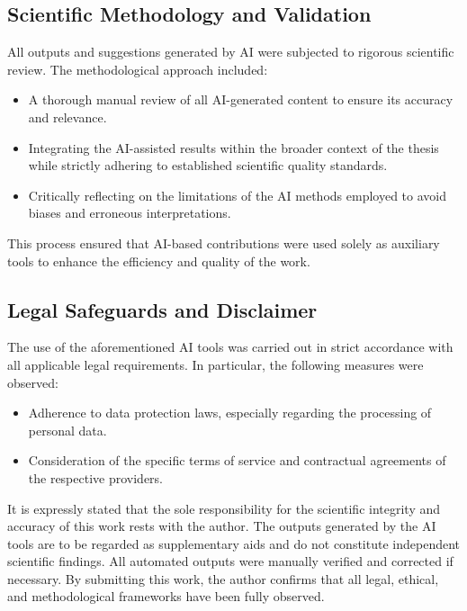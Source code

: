 \subsection*{Scientific Methodology and Validation}
All outputs and suggestions generated by AI were subjected to rigorous scientific review. The methodological approach included:
\begin{itemize}
    \item A thorough manual review of all AI-generated content to ensure its accuracy and relevance.
    \item Integrating the AI-assisted results within the broader context of the thesis while strictly adhering to established scientific quality standards.
    \item Critically reflecting on the limitations of the AI methods employed to avoid biases and erroneous interpretations.
\end{itemize}
This process ensured that AI-based contributions were used solely as auxiliary tools to enhance the efficiency and quality of the work.

\subsection*{Legal Safeguards and Disclaimer}
The use of the aforementioned AI tools was carried out in strict accordance with all applicable legal requirements. In particular, the following measures were observed:
\begin{itemize}
    \item Adherence to data protection laws, especially regarding the processing of personal data.
    \item Consideration of the specific terms of service and contractual agreements of the respective providers.
\end{itemize}
It is expressly stated that the sole responsibility for the scientific integrity and accuracy of this work rests with the author. The outputs generated by the AI tools are to be regarded as supplementary aids and do not constitute independent scientific findings. All automated outputs were manually verified and corrected if necessary. By submitting this work, the author confirms that all legal, ethical, and methodological frameworks have been fully observed.

